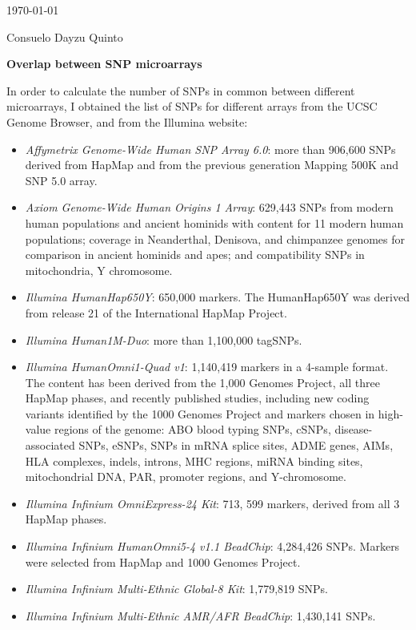 \documentclass[11pt]{report}
\begin{document}
\today

Consuelo Dayzu Quinto

\begin{center}
\textbf{Overlap between SNP microarrays}
\end{center}

In order to calculate the number of SNPs in common between different microarrays, I obtained the list of SNPs for different arrays from the UCSC Genome Browser, and from the Illumina website:

\begin{itemize}
\item \textit{Affymetrix Genome-Wide Human SNP Array 6.0}: more than 906,600 SNPs derived from  HapMap and from the previous generation Mapping 500K and SNP 5.0  array. 
\item \textit{Axiom Genome-Wide Human Origins 1 Array}: 629,443 SNPs from modern human populations and ancient hominids with content for 11 modern human populations; coverage in Neanderthal, Denisova, and chimpanzee
genomes for comparison in ancient hominids and apes; and compatibility SNPs in mitochondria, Y chromosome. 
\item \textit{Illumina HumanHap650Y}: 650,000 markers. The HumanHap650Y was derived from release 21 of the International HapMap Project.
\item \textit{Illumina Human1M-Duo}: more than 1,100,000 tagSNPs.
\item \textit{Illumina HumanOmni1-Quad v1}: 1,140,419 markers in a 4-sample format. The content has been derived from the 1,000 Genomes Project, all three HapMap phases, and recently published studies, including new coding variants identified by the 1000 Genomes Project and markers chosen in high-value regions of the genome: ABO blood typing SNPs, cSNPs, disease-associated SNPs, eSNPs, SNPs in mRNA splice sites, ADME genes, AIMs, HLA complexes, indels, introns, MHC regions, miRNA binding sites, mitochondrial DNA, PAR, promoter regions, and Y-chromosome.
\item \textit{Illumina Infinium OmniExpress-24 Kit}: 713, 599 markers, derived from all 3 HapMap phases. 
\item \textit{Illumina Infinium HumanOmni5-4 v1.1 BeadChip}: 4,284,426 SNPs. Markers were selected from HapMap and 1000 Genomes Project.
\item \textit{Illumina Infinium Multi-Ethnic Global-8 Kit}: 1,779,819 SNPs. 
\item \textit{Illumina Infinium Multi-Ethnic AMR/AFR BeadChip}: 1,430,141 SNPs. 
\end{itemize}
\end{document}
